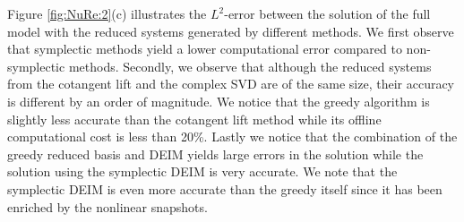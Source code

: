Figure \ref{fig:NuRe:2}(c) illustrates the $L^2$-error between the solution of the full model with the reduced systems generated by different methods. We first observe that symplectic methods yield a lower computational error compared to non-symplectic methods. Secondly, we observe that although the reduced systems from the cotangent lift and the complex SVD are of the same size, their accuracy is different by an order of magnitude. We notice that the greedy algorithm is slightly less accurate than the cotangent lift method while its offline computational cost is less than 20\%. Lastly we notice that the combination of the greedy reduced basis and DEIM yields large errors in the solution while the solution using the symplectic DEIM is very accurate. We note that the symplectic DEIM is even more accurate than the greedy itself since it has been enriched by the nonlinear snapshots. 







